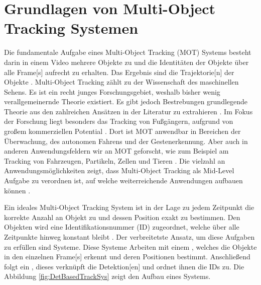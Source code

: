 \section{Grundlagen von Multi-Object Tracking Systemen}
Die fundamentale Aufgabe eines \gls{Multi-Object Tracking} (\acrshort{MOT}) Systems besteht darin in einem Video mehrere Objekte zu  und die Identitäten der Objekte über alle \gls{Frame}[s] aufrecht zu erhalten. Das Ergebnis sind die \gls{Trajektorie}[n] der Objekte \cite{CLEAR.2008, HOTA, Luo.2022}. \gls{Multi-Object Tracking} zählt zu der Wissenschaft des maschinellen Sehens. Es ist ein recht junges Forschungsgebiet, weshalb bisher wenig verallgemeinernde Theorie existiert. Es gibt jedoch Bestrebungen grundlegende Theorie aus den zahlreichen Ansätzen in der Literatur zu extrahieren \cite{Luo.2022}. Im Fokus der Forschung liegt besonders das Tracking von Fußgängern, aufgrund von großem kommerziellen Potential \cite{Luo.2022}. Dort ist \acrshort{MOT} anwendbar in Bereichen der Überwachung, des autonomen Fahrens und der Gestenerkennung. Aber auch in anderen Anwendungsfeldern wir an \acrshort{MOT} geforscht, wie zum Beispiel am \gls{Tracking} von Fahrzeugen, Partikeln, Zellen und Tieren \cite{Luo.2022, CLEAR.2008, Crocker.1996}. Die vielzahl an Anwendungsmöglichkeiten zeigt, dass \gls{Multi-Object Tracking} als \gls{Mid-Level Aufgabe} zu verordnen ist, auf welche weiterreichende Anwendungen aufbauen können \cite{Luo.2022}.\par

Ein ideales \gls{Multi-Object Tracking} System ist in der Lage zu jedem Zeitpunkt die korrekte Anzahl an Objekt zu  und dessen Position exakt zu bestimmen. Den Objekten wird eine Identifikationsnummer (\acrshort{ID}) zugeordnet, welche über alle Zeitpunkte hinweg konstant bleibt \cite{CLEAR.2008}. Der verbreitetste Ansatz, um diese Aufgaben zu erfüllen sind  Systeme. Diese Systeme  Arbeiten mit einem , welches die Objekte in den einzelnen \gls{Frame}[s] erkennt und deren Positionen bestimmt. Anschließend folgt ein , dieses verknüpft die \gls{Detektion}[en] und ordnet ihnen die \acrshort{ID}s zu\cite{Luo.2022}. Die Abbildung \ref{fig:DetBasedTrackSys} zeigt den Aufbau eines  Systems. 


